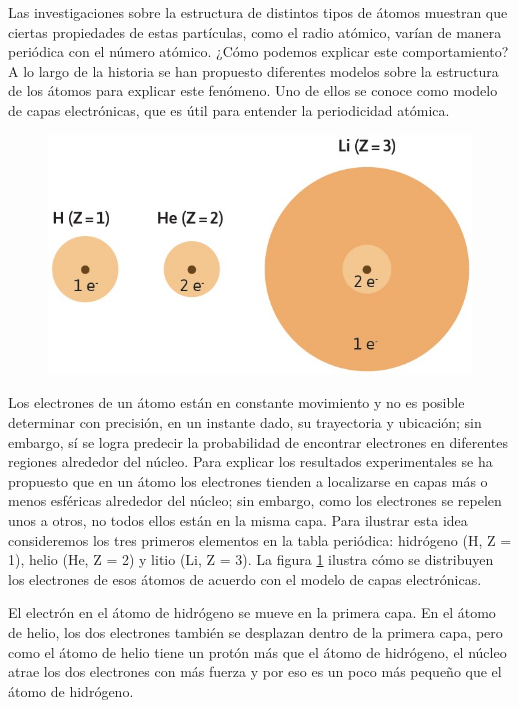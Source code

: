 \documentclass[11pt]{book}
\begin{document}
Las investigaciones sobre la estructura de distintos tipos de átomos muestran que ciertas propiedades de estas partículas,
como el radio atómico, varían de manera periódica con el número atómico. ¿Cómo podemos explicar este comportamiento?
A lo largo de la historia se han propuesto diferentes modelos sobre la estructura de los átomos para explicar este fenómeno.
Uno de ellos se conoce como modelo de capas electrónicas, que es útil para entender la periodicidad atómica.


\begin{figure}[H]
  \centering
  \includegraphics[width=0.4\linewidth]{capas01.jpg}
  \label{fig:capas01}
\end{figure}

Los electrones de un átomo están en constante movimiento y no es posible determinar con precisión,
en un instante dado, su trayectoria y ubicación; sin embargo, sí se logra predecir la probabilidad de
encontrar electrones en diferentes regiones alrededor del núcleo. Para explicar los resultados
experimentales se ha propuesto que en un átomo los electrones tienden a localizarse en capas más o
menos esféricas alrededor del núcleo; sin embargo, como los electrones se repelen unos a otros, no
todos ellos están en la misma capa. Para ilustrar esta idea consideremos los tres primeros elementos
en la tabla periódica: hidrógeno (H, Z = 1), helio (He, Z = 2) y litio (Li, Z = 3).
La figura \ref{fig:capas01} ilustra cómo se distribuyen los electrones de esos átomos de acuerdo
con el modelo de capas electrónicas.



El electrón en el átomo de hidrógeno se mueve en la primera capa. En el átomo de helio, los dos electrones
también se desplazan dentro de la primera capa, pero como el átomo de helio tiene un protón más que el átomo
de hidrógeno, el núcleo atrae los dos electrones con más fuerza y por eso es un poco más pequeño que el átomo de hidrógeno.
\end{document}
